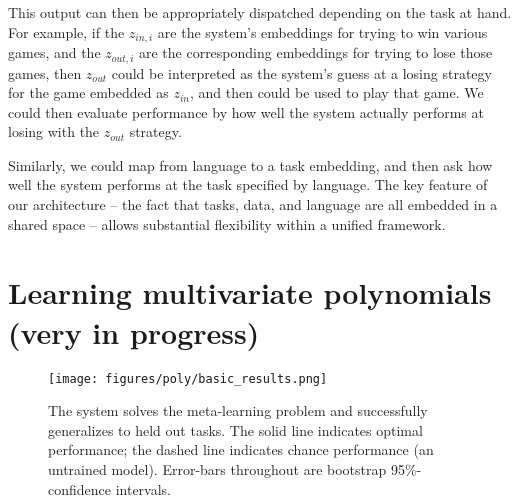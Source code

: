 \documentclass{article}
\begin{document}
This output can then be appropriately dispatched depending on the task at hand. For example, if the $z_{in,i}$ are the system's embeddings for trying to win various games, and the $z_{out,i}$ are the corresponding embeddings for trying to lose those games, then $z_{out}$ could be interpreted as the system's guess at a losing strategy for the game embedded as $z_{in}$, and then could be used to play that game. We could then evaluate performance by how well the system actually performs at losing with the $z_{out}$ strategy. \par
Similarly, we could map from language to a task embedding, and then ask how well the system performs at the task specified by language. The key feature of our architecture -- the fact that tasks, data, and language are all embedded in a shared space -- allows substantial flexibility within a unified framework. 

%
\section{Learning multivariate polynomials (very in progress)}
\begin{figure}
\centering
\texttt{[image: figures/poly/basic\_results.png]}
\caption{The system solves the meta-learning problem and successfully generalizes to held out tasks. The solid line indicates optimal performance; the dashed line indicates chance performance (an untrained model). Error-bars throughout are bootstrap 95\%-confidence intervals.}
\label{poly_basic_results}
\end{figure}
\end{document}
